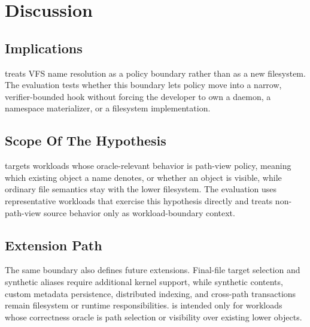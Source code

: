 \section{Discussion}
\label{sec:discussion}

\subsection{Implications}

\namei treats VFS name resolution as a policy boundary rather than as a new
filesystem. The evaluation tests whether this boundary lets policy move into a
narrow, verifier-bounded hook without forcing the
developer to own a daemon, a namespace materializer, or a filesystem
implementation.

\subsection{Scope Of The Hypothesis}

\namei targets workloads whose oracle-relevant behavior is path-view policy,
meaning which existing object a name denotes, or whether an object is visible,
while ordinary file semantics stay with the lower filesystem. The evaluation uses
representative workloads that exercise this hypothesis directly and treats
non-path-view source behavior only as workload-boundary context.

\subsection{Extension Path}

The same boundary also defines future extensions. Final-file target selection
and synthetic aliases require additional kernel support, while synthetic
contents, custom metadata persistence, distributed indexing, and cross-path
transactions remain filesystem or runtime responsibilities. \namei is intended
only for workloads whose correctness oracle is path selection or visibility over
existing lower objects.
